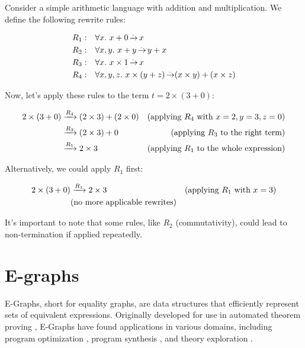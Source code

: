 \begin{example}
\label{perlim:rewriting_example}
Consider a simple arithmetic language with addition and multiplication. We define the following rewrite rules:

\begin{align*}
R_1:& \quad \forall x.~x + 0 \operatorname{\overset{.\,}{\rightarrow}} x \\
R_2:& \quad \forall x, y.~x + y \operatorname{\overset{.\,}{\rightarrow}} y + x \\
R_3:& \quad \forall x.~x \times 1 \operatorname{\overset{.\,}{\rightarrow}} x \\
R_4:& \quad \forall x, y, z.~x \times (y + z) \operatorname{\overset{.\,}{\rightarrow}} (x \times y) + (x \times z)
\end{align*}

Now, let's apply these rules to the term $t = 2 \times (3 + 0)$:

\begin{align*}
2 \times (3 + 0) &\xrightarrow[]{R_4} (2 \times 3) + (2 \times 0) &\text{(applying $R_4$ with $x = 2, y = 3, z = 0$)} \\
                 &\xrightarrow[]{R_3} (2 \times 3) + 0 &\text{(applying $R_3$ to the right term)} \\
                 &\xrightarrow[]{R_1} 2 \times 3 &\text{(applying $R_1$ to the whole expression)}
\end{align*}

Alternatively, we could apply $R_1$ first:

\begin{align*}
2 \times (3 + 0) &\xrightarrow[]{R_1} 2 \times 3 &\text{(applying $R_1$ with $x = 3$)} \\
                 &\text{(no more applicable rewrites)} \\
\end{align*}

It's important to note that some rules, like $R_2$ (commutativity), could lead to non-termination if applied repeatedly.
\end{example}

\section{E-graphs}
\label{perlims:e-graphs}

E-Graphs, short for equality graphs, are data structures that efficiently represent sets of equivalent expressions. 
Originally developed for use in automated theorem proving \cite{egraphsnelson1980fast}, E-Graphs have found applications in various domains, including program optimization \cite{eqsat}, program synthesis \cite{herbie}, and theory exploration \cite{thesy}.

